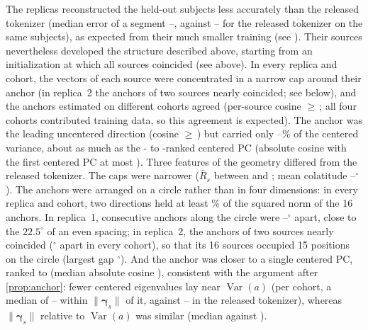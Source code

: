 \documentclass[10pt,letterpaper]{article}
\newcommand{\Rbar}{\bar{R}}
\begin{document}
The replicas reconstructed the held-out subjects less accurately than the released tokenizer
(median error of a segment \RepMSEMin--\RepMSEMax, against \RepReleasedMSEMin--\RepReleasedMSEMax{}
for the released tokenizer on the same subjects), as expected from their much smaller training
(see ). Their sources nevertheless developed the structure described above,
starting from an initialization at which all sources coincided (see above). In every
replica and cohort, the vectors of each source were concentrated in a narrow cap around their anchor
(in replica~2 the anchors of two sources nearly coincided; see below), and the anchors estimated on
different cohorts agreed (per-source cosine $\geq$\,\RepCrossCohortMin; all four cohorts contributed
training data, so this agreement is expected). The anchor was the leading
uncentered direction (cosine $\geq$\,\RepCosUncMin) but carried only
\RepAnchorVarFracMin--\RepAnchorVarFracMax\% of the centered variance, about as much as the
\RepAnchorRankMin- to \RepAnchorRankMax-ranked centered PC (absolute cosine with the first centered PC
at most \RepCosCPConeMax). Three features of the geometry differed from the released tokenizer. The
caps were narrower ($\Rbar_s$ between \RepRbarMin{} and \RepRbarMax; mean colatitude
\RepAngleMin--\RepAngleMax$^\circ$). The anchors were arranged on a circle rather than in four
dimensions: in every replica and cohort, two directions held at least \RepAnchorTwoShareMin\% of
the squared norm of the 16 anchors. In replica~1, consecutive anchors along the circle were
\ReplicaOneGapMin--\ReplicaOneGapMax$^\circ$ apart, close to the $22.5^\circ$ of an even spacing; in
replica~2, the anchors of two sources nearly coincided (\ReplicaTwoMinAngleMin$^\circ$ apart in every
cohort), so that its 16 sources occupied 15 positions on the circle (largest gap
\ReplicaTwoGapMax$^\circ$). And
the anchor was closer to a single centered PC, ranked \RepBestCPCRankMin{} to \RepBestCPCRankMax{}
(median absolute cosine \RepBestCPCMedian), consistent with the argument after \cref{prop:anchor}:
fewer centered eigenvalues lay near $\operatorname{Var}(a)$ (per cohort, a median of
\RepWindowCountMin--\RepWindowCountMax{} within $\lVert\bm{\gamma}_s\rVert$ of it, against
\WindowCountMin--\WindowCountMax{} in the released tokenizer), whereas $\lVert\bm{\gamma}_s\rVert$
relative to $\operatorname{Var}(a)$ was similar (median \RepGammaOverVarMedian{} against
\GammaOverVarMedian).
\end{document}

